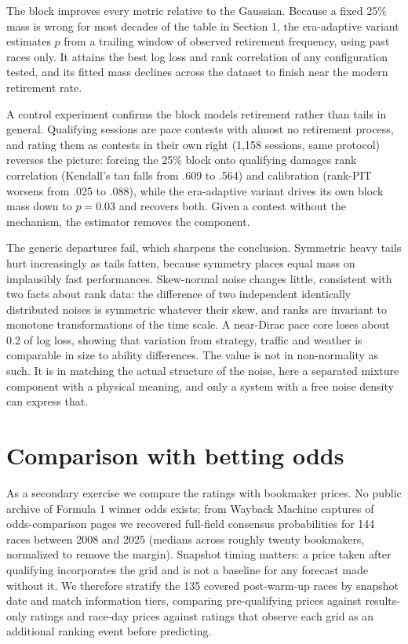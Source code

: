\documentclass[11pt]{article}
\begin{document}
The block improves every metric relative to the Gaussian. Because a fixed
25\% mass is wrong for most decades of the table in Section 1, the
era-adaptive variant estimates $p$ from a trailing window of observed
retirement frequency, using past races only. It attains the best log loss
and rank correlation of any configuration tested, and its fitted mass
declines across the dataset to finish near the modern retirement rate.

A control experiment confirms the block models retirement rather than
tails in general. Qualifying sessions are pace contests with almost no
retirement process, and rating them as contests in their own right
(1{,}158 sessions, same protocol) reverses the picture: forcing the 25\%
block onto qualifying damages rank correlation (Kendall's tau falls from
.609 to .564) and calibration (rank-PIT worsens from .025 to .088), while
the era-adaptive variant drives its own block mass down to $p = 0.03$ and
recovers both. Given a contest without the mechanism, the estimator
removes the component.

The generic departures fail, which sharpens the conclusion. Symmetric
heavy tails hurt increasingly as tails fatten, because symmetry places
equal mass on implausibly fast performances. Skew-normal noise changes
little, consistent with two facts about rank data: the difference of two
independent identically distributed noises is symmetric whatever their
skew, and ranks are invariant to monotone transformations of the time
scale. A near-Dirac pace core loses about 0.2 of log loss, showing that
variation from strategy, traffic and weather is comparable in size to
ability differences. The value is not in non-normality as such. It is in
matching the actual structure of the noise, here a separated mixture
component with a physical meaning, and only a system with a free noise
density can express that.

\section{Comparison with betting odds}

As a secondary exercise we compare the ratings with bookmaker prices. No
public archive of Formula 1 winner odds exists; from Wayback Machine
captures of odds-comparison pages we recovered full-field consensus
probabilities for 144 races between 2008 and 2025 (medians across roughly
twenty bookmakers, normalized to remove the margin). Snapshot timing
matters: a price taken after qualifying incorporates the grid and is not a
baseline for any forecast made without it. We therefore stratify the 135
covered post-warm-up races by snapshot date and match information tiers,
comparing pre-qualifying prices against results-only ratings and race-day
prices against ratings that observe each grid as an additional ranking
event before predicting.
\end{document}
